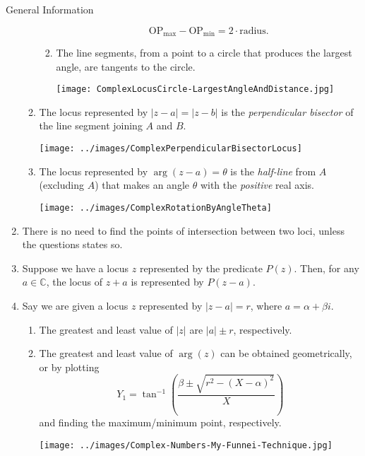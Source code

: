 \documentclass[oneside]{book}
\begin{document}
\begin{stbox}{General Information}
\begin{enumerate}
\begin{enumerate}
\begin{enumerate}
        \[\text{OP}_{\text{max}}-\text{OP}_{\text{min}}=2\cdot\text{radius}.\]
        \item The line segments, from a point to a circle that produces the largest angle, are tangents to the circle.
        \begin{center}
          \texttt{[image: ComplexLocusCircle-LargestAngleAndDistance.jpg]}
        \end{center}
      \end{enumerate}
      \item The locus represented by \(\lvert z-a \rvert =\lvert z-b \rvert\) is the \emph{perpendicular bisector} of the line segment joining \(A\) and \(B\).
      \begin{center}
        \texttt{[image: ../images/ComplexPerpendicularBisectorLocus]}
      \end{center}
      \item The locus represented by \(\arg(z-a)=\theta\) is the \emph{half-line} from \(A\) (excluding \(A\)) that makes an angle \(\theta\) with the \emph{positive} real axis.
      \begin{center}
        \texttt{[image: ../images/ComplexRotationByAngleTheta]}
      \end{center}
    \end{enumerate}
    \item There is no need to find the points of intersection between two loci, unless the questions states so. 
    \item Suppose we have a locus \(z\) represented by the predicate \(P(z)\). Then, for any \(a\in \mathbb{C}\), the locus of \(z+a\) is represented by \(P(z-a)\).
    \item Say we are given a locus \(z\) represented by \(\lvert z-a \rvert=r\), where \(a=\alpha+\beta i\). 
    \begin{enumerate}
      \item The greatest and least value of \(\lvert z \rvert\) are \(\lvert a \rvert \pm r\), respectively. 
      \item The greatest and least value of \(\arg(z)\) can be obtained geometrically, or by plotting 
      \[Y_1=\tan^{-1}\left(\frac{\beta\pm\sqrt{r^2-(X-\alpha)^2}}{X}\right)\]
      and finding the maximum/minimum point, respectively.
      \begin{center}
        \texttt{[image: ../images/Complex-Numbers-My-Funnei-Technique.jpg]}
      \end{center}
    \end{enumerate}
  \end{enumerate}
\end{stbox}
\end{document}
